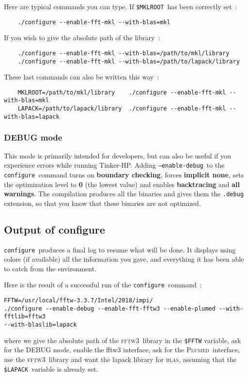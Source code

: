 \documentclass[peerreview]{IEEEtran}
\def\LAPACK{\texttt{\$LAPACK}}
\def\MKLROOT{\texttt{\$MKLROOT}}
\def\blas{\textsc{blas}}
\def\fftwt{\textsc{fftw3}}
\def\config{\texttt{configure}}
\def\plumed{\textsc{Plumed}}
\def\enadeb{\texttt{--enable-debug}}
\begin{document}
Here are typical commands you can type. If \MKLROOT\ has been correctly set~:
\begin{verbatim}
    ./configure --enable-fft-mkl --with-blas=mkl
\end{verbatim}

If you wish to give the absolute path of the library~:
\begin{verbatim}
    ./configure --enable-fft-mkl --with-blas=/path/to/mkl/library
    ./configure --enable-fft-mkl --with-blas=/path/to/lapack/library
\end{verbatim}

These last commands can also be written this way~:
\begin{verbatim}
    MKLROOT=/path/to/mkl/library    ./configure --enable-fft-mkl --with-blas=mkl
    LAPACK=/path/to/lapack/library  ./configure --enable-fft-mkl --with-blas=lapack
\end{verbatim}

\vskip5mm
\subsubsection{DEBUG mode}
This mode is primarily intended for developers, but can also be useful if you experience errors while running Tinker-HP. Adding \enadeb\ to the \config\ command turns on \textbf{boundary checking}, forces  \textbf{implicit none}, sets the optimization level to \textbf{0} (the lowest value) and enables \textbf{backtracing} and  \textbf{all warnings}. The compilation produces all the binaries and gives them the \texttt{.debug} extension, so that you know that these binaries are not optimized. 

\subsection{Output of configure}
\config\ produces a final log to resume what will be done. It displays using colors (if available) all the information you gave, and everything it has been able to catch from the environment. 

Here is the result of a successful run of the \config\ command~:

\begin{verbatim}
FFTW=/usr/local/fftw-3.3.7/Intel/2018/impi/
./configure --enable-debug --enable-fft-fftw3 --enable-plumed --with-fftlib=fftw3
--with-blaslib=lapack
\end{verbatim}

where we give the absolute path of the \fftwt\  library in the \texttt{\$FFTW} variable, ask for the DEBUG mode, enable the fftw3 interface, ask for the \plumed\ interface, use the \fftwt\ library and want the lapack library for  \blas, assuming that the  \LAPACK\  variable is already set.
\end{document}
